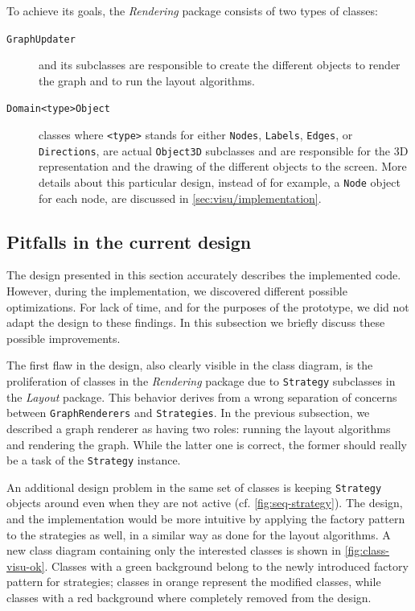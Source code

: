 To achieve its goals, the \emph{Rendering} package consists of two types of classes:
\begin{description}
  \item[\texttt{GraphUpdater}] and its subclasses are responsible to create the different objects to render the graph and to run the layout algorithms.
  \item[\texttt{Domain<type>Object}] classes where \texttt{<type>} stands for either \texttt{Nodes}, \texttt{Labels}, \texttt{Edges}, or \texttt{Directions}, are actual \texttt{Object3D} subclasses and are responsible for the 3D representation and the drawing of the different objects to the screen. More details about this particular design, instead of for example, a \texttt{Node} object for each node, are discussed in \vref{sec:visu/implementation}.
\end{description}

\subsection{Pitfalls in the current design}
\label{sec:visu/design/pitfalls}

The design presented in this section accurately describes the implemented code. However, during the implementation, we discovered different possible optimizations. For lack of time, and for the purposes of the prototype, we did not adapt the design to these findings. In this subsection we briefly discuss these possible improvements.

The first flaw in the design, also clearly visible in the class diagram, is the proliferation of classes in the \emph{Rendering} package due to \texttt{Strategy} subclasses in the \emph{Layout} package. This behavior derives from a wrong separation of concerns between \texttt{GraphRenderers} and \texttt{Strategies}. In the previous subsection, we described a graph renderer as having two roles: running the layout algorithms and rendering the graph. While the latter one is correct, the former should really be a task of the \texttt{Strategy} instance.

An additional design problem in the same set of classes is keeping \texttt{Strategy} objects around even when they are not active (cf. \vref{fig:seq-strategy}). The design, and the implementation would be more intuitive by applying the factory pattern to the strategies as well, in a similar way as done for the layout algorithms. A new class diagram containing only the interested classes is shown in \vref{fig:class-visu-ok}. Classes with a green background belong to the newly introduced factory pattern for strategies; classes in orange represent the modified classes, while classes with a red background where completely removed from the design.

